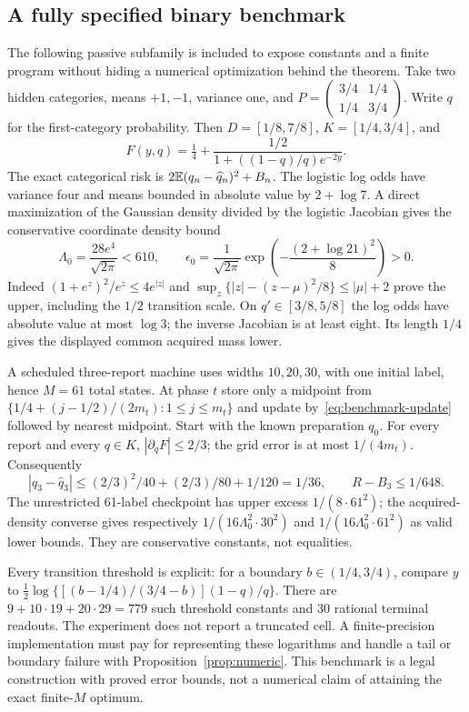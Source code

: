 \subsection{A fully specified binary benchmark}
The following passive subfamily is included to expose constants and a finite program without hiding a numerical optimization behind the theorem. Take two hidden categories, means $+1,-1$, variance one, and
$P=\left(\begin{smallmatrix}3/4&1/4\\1/4&3/4\end{smallmatrix}\right)$.
Write $q$ for the first-category probability. Then $D=[1/8,7/8]$, $K=[1/4,3/4]$, and
\begin{equation}\label{eq:benchmark-update}
 F(y,q)=\tfrac14+\frac{1/2}{1+((1-q)/q)e^{-2y}}.
\end{equation}
The exact categorical risk is $2\mathbb E(q_n-\widehat q_n)^2+B_n$. The logistic log odds have variance four and means bounded in absolute value by $2+\log7$. A direct maximization of the Gaussian density divided by the logistic Jacobian gives the conservative coordinate density bound
\begin{equation}\label{eq:benchmark-constants}
 \Lambda_0=\frac{28e^4}{\sqrt{2\pi}}<610,
 \qquad
 \epsilon_0=\frac1{\sqrt{2\pi}}
       \exp\left(-\frac{(2+\log21)^2}{8}\right)>0.
\end{equation}
Indeed $(1+e^z)^2/e^z\le4e^{|z|}$ and
$\sup_z\{|z|-(z-\mu)^2/8\}\le|\mu|+2$ prove the upper, including the $1/2$ transition scale. On $q'\in[3/8,5/8]$ the log odds have absolute value at most $\log3$; the inverse Jacobian is at least eight. Its length $1/4$ gives the displayed common acquired mass lower.

A scheduled three-report machine uses widths $10,20,30$, with one initial label, hence $M=61$ total states. At phase $t$ store only a midpoint from
$\{1/4+(j-1/2)/(2m_t):1\le j\le m_t\}$ and update by~\eqref{eq:benchmark-update} followed by nearest midpoint. Start with the known preparation $q_0$. For every report and every $q\in K$,
$|\partial_qF|\le2/3$; the grid error is at most $1/(4m_t)$. Consequently
\[
 |q_3-\widehat q_3|
 \le(2/3)^2/40+(2/3)/80+1/120=1/36,
 \qquad R-B_3\le1/648.
\]
The unrestricted 61-label checkpoint has upper excess $1/(8\cdot61^2)$; the acquired-density converse gives respectively
$1/(16\Lambda_0^2\cdot30^2)$ and $1/(16\Lambda_0^2\cdot61^2)$ as valid lower bounds. They are conservative constants, not equalities.

Every transition threshold is explicit: for a boundary $b\in(1/4,3/4)$, compare $y$ to
$\frac12\log\{[(b-1/4)/(3/4-b)](1-q)/q\}$.
There are $9+10\cdot19+20\cdot29=779$ such threshold constants and 30 rational terminal readouts. The experiment does not report a truncated cell. A finite-precision implementation must pay for representing these logarithms and handle a tail or boundary failure with Proposition~\ref{prop:numeric}. This benchmark is a legal construction with proved error bounds, not a numerical claim of attaining the exact finite-$M$ optimum.
